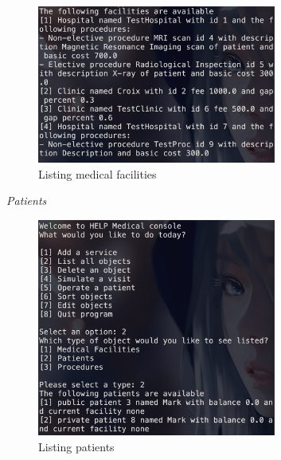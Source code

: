 \documentclass{article}
\begin{document}
	\begin{figure}
		\begin{center}
			\includegraphics[width=0.7\textwidth]{figures/Listing/Listing_Medical_02.png}
		\end{center}
		\caption{Listing medical facilities}\label{fig:listing_medical_02}
	\end{figure}
	
	\textit{Patients}
	\begin{figure}
		\begin{center}
			\includegraphics[width=0.7\textwidth]{figures/Listing/Listing_Patients.png}
		\end{center}
		\caption{Listing patients}\label{fig:listing_patients}
	\end{figure}
	
\end{document}
